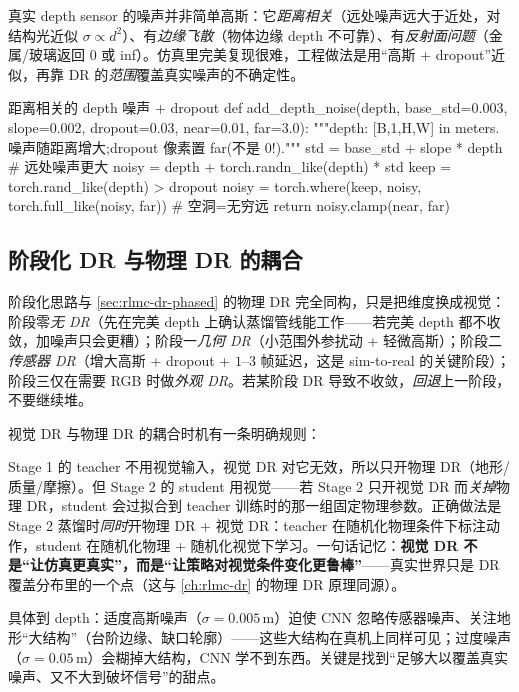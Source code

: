 真实 depth sensor 的噪声并非简单高斯：它\emph{距离相关}（远处噪声远大于近处，对结构光近似 $\sigma\propto d^2$）、有\emph{边缘飞散}（物体边缘 depth 不可靠）、有\emph{反射面问题}（金属/玻璃返回 $0$ 或 inf）。仿真里完美复现很难，工程做法是用“高斯 + dropout”近似，再靠 DR 的\emph{范围}覆盖真实噪声的不确定性。

\begin{codebox}[Python]{距离相关的 depth 噪声 + dropout}
def add_depth_noise(depth, base_std=0.003, slope=0.002,
                    dropout=0.03, near=0.01, far=3.0):
    """depth: [B,1,H,W] in meters.噪声随距离增大;dropout 像素置 far(不是 0!)."""
    std = base_std + slope * depth                 # 远处噪声更大
    noisy = depth + torch.randn_like(depth) * std
    keep = torch.rand_like(depth) > dropout
    noisy = torch.where(keep, noisy, torch.full_like(noisy, far))  # 空洞=无穷远
    return noisy.clamp(near, far)
\end{codebox}

\subsection{阶段化 DR 与物理 DR 的耦合}
\label{sec:rlmc-vm-dr-phased}

阶段化思路与 \cref{sec:rlmc-dr-phased} 的物理 DR 完全同构，只是把维度换成视觉：阶段零\emph{无 DR}（先在完美 depth 上确认蒸馏管线能工作——若完美 depth 都不收敛，加噪声只会更糟）；阶段一\emph{几何 DR}（小范围外参扰动 + 轻微高斯）；阶段二\emph{传感器 DR}（增大高斯 + dropout + $1$--$3$ 帧延迟，这是 sim-to-real 的关键阶段）；阶段三仅在需要 RGB 时做\emph{外观 DR}。若某阶段 DR 导致不收敛，\emph{回退}上一阶段，不要继续堆。

视觉 DR 与物理 DR 的耦合时机有一条明确规则：

\begin{insight}\label{ins:rlmc-vm-drcouple}
Stage 1 的 teacher 不用视觉输入，视觉 DR 对它无效，所以只开物理 DR（地形/质量/摩擦）。但 Stage 2 的 student 用视觉——若 Stage 2 只开视觉 DR 而\emph{关掉}物理 DR，student 会过拟合到 teacher 训练时的那一组固定物理参数。正确做法是 Stage 2 蒸馏时\emph{同时}开物理 DR + 视觉 DR：teacher 在随机化物理条件下标注动作，student 在随机化物理 + 随机化视觉下学习。一句话记忆：\textbf{视觉 DR 不是“让仿真更真实”，而是“让策略对视觉条件变化更鲁棒”}——真实世界只是 DR 覆盖分布里的一个点（这与 \cref{ch:rlmc-dr} 的物理 DR 原理同源）。
\end{insight}

具体到 depth：适度高斯噪声（$\sigma=0.005$\,m）迫使 CNN 忽略传感器噪声、关注地形“大结构”（台阶边缘、缺口轮廓）——这些大结构在真机上同样可见；过度噪声（$\sigma=0.05$\,m）会糊掉大结构，CNN 学不到东西。关键是找到“足够大以覆盖真实噪声、又不大到破坏信号”的甜点。

